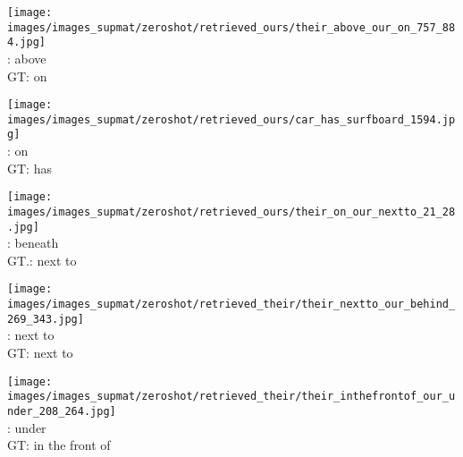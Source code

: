 \documentclass[10pt,twocolumn,letterpaper]{article}
\begin{document}
\begin{figure*}[t]
    \begin{minipage}[t]{0.185\textwidth}
    	\centering
       	\texttt{[image: images/images\_supmat/zeroshot/retrieved\_ours/their\_above\_our\_on\_757\_884.jpg]}\\
       	\vspace{0.3ex}
       	\cite{Lu16}: above \\
       	GT: on
       	\vspace{2ex}
    \end{minipage}
    \hspace{0.005\textwidth}
    \begin{minipage}[t]{0.185\textwidth}
    	\centering
       	\texttt{[image: images/images\_supmat/zeroshot/retrieved\_ours/car\_has\_surfboard\_1594.jpg]}\\
       	\vspace{0.3ex}
       	\cite{Lu16}: on \\
       	GT: has
       	\vspace{0.2ex}
    \end{minipage}
    \hspace{0.005\textwidth}
    \begin{minipage}[t]{0.185\textwidth}
       \centering
       \texttt{[image: images/images\_supmat/zeroshot/retrieved\_ours/their\_on\_our\_nextto\_21\_28.jpg]}\\
       \vspace{0.3ex}
       \cite{Lu16}: beneath \\
       GT.: next to
       \vspace{0.2ex}
    \end{minipage}
    \hspace{0.005\textwidth}
    \begin{minipage}[t]{0.185\textwidth}
    	\centering
       	\texttt{[image: images/images\_supmat/zeroshot/retrieved\_their/their\_nextto\_our\_behind\_269\_343.jpg]}\\
       	\vspace{0.3ex}
       	\cite{Lu16}: next to \\
       	GT: next to
       	\vspace{0.2ex}
    \end{minipage}
    \hspace{0.005\textwidth}  
    \begin{minipage}[t]{0.185\textwidth}
    	\centering
       	\texttt{[image: images/images\_supmat/zeroshot/retrieved\_their/their\_inthefrontof\_our\_under\_208\_264.jpg]}\\
		\vspace{0.3ex}       	
       	\cite{Lu16}: under \\
       	GT: in the front of
      	\vspace{0.2ex}
    \end{minipage} 



\end{figure*}
\end{document}
